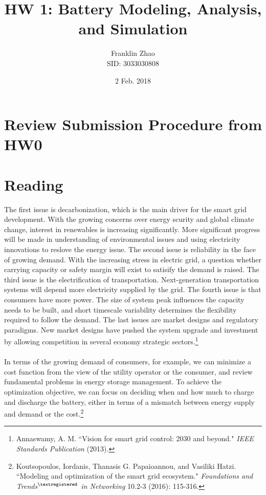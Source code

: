 \documentclass[12pt]{article}
\title{HW 1: Battery Modeling, Analysis, and Simulation}
\date{2 Feb. 2018}
\author{Franklin Zhao \\ SID: 3033030808}
\begin{document}
	
	\maketitle
	\newcommand{\tabitem}{~~\llap{\textbullet}~~}
	\renewcommand\theequation{\arabic{equation}}
	\renewcommand{\figurename}{Fig.}
	\renewcommand\thesection{Problem \arabic{section}:}
	\renewcommand\thesubsection{(\alph{subsection})}
	\onehalfspacing
	
\section{Review Submission Procedure from HW0}
\section{Reading}
The first issue is decarbonization, which is the main driver for the smart grid development. With the growing concerns over energy scurity and global climate change, interest in renewables is increasing significantly. More significant progress will be made in understanding of environmental issues and using electricity innovations to reslove the energy issue. The second issue is reliability in the face of growing demand. With the increasing stress in electric grid, a question whether carrying capacity or safety margin will exist to satisify the demand is raised. The third issue is the electrification of transportation. Next-generation transportation systems will depend more electricity supplied by the grid. The fourth issue is that consumers have more power. The size of system peak influences the capacity needs to be built, and short timescale variability determines the flexibility required to follow the demand. The last issues are market designs and regulatory paradigms. New market designs have pushed the system upgrade and investment by allowing competition in several economy strategic sectors.\footnote{Annaswamy, A. M. ``Vision for smart grid control: 2030 and beyond." \textit{IEEE Standards Publication} (2013).}\\\\
In terms of the growing demand of consumers, for example, we can minimize a cost function from the view of the utility operator or the consumer, and review fundamental problems in energy storage management. To achieve the optimization objective,
we can focus on deciding when and how much to charge and discharge the battery, either in terms of a mismatch between energy supply and demand or the cost.\footnote{Koutsopoulos, Iordanis, Thanasis G. Papaioannou, and Vasiliki Hatzi. ``Modeling and optimization of the smart grid ecosystem." \textit{Foundations and Trends$^{\tiny{\textregistered}}$ in Networking} 10.2-3 (2016): 115-316.}
\end{document}

